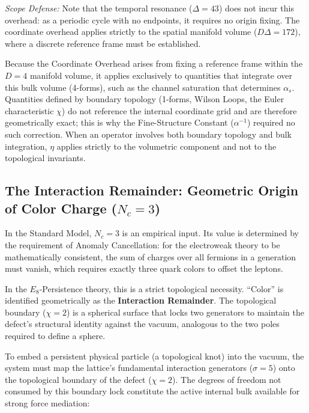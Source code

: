 \textit{Scope Defense:} Note that the temporal resonance ($\Delta = 43$) does not incur this overhead: as a periodic cycle with no endpoints, it requires no origin fixing. The coordinate overhead applies strictly to the spatial manifold volume ($D\Delta = 172$), where a discrete reference frame must be established.

Because the Coordinate Overhead arises from fixing a reference frame within the $D=4$ manifold volume, it applies exclusively to quantities that integrate over this bulk volume (4-forms), such as the channel saturation that determines $\alpha_s$. Quantities defined by boundary topology (1-forms, Wilson Loops, the Euler characteristic $\chi$) do not reference the internal coordinate grid and are therefore geometrically exact; this is why the Fine-Structure Constant ($\alpha^{-1}$) required no such correction. When an operator involves both boundary topology and bulk integration, $\eta$ applies strictly to the volumetric component and not to the topological invariants.


\subsection{The Interaction Remainder: Geometric Origin of Color Charge (\texorpdfstring{$N_c = 3$}{Nc = 3})}

In the Standard Model, $N_c = 3$ is an empirical input. Its value is determined by the requirement of Anomaly Cancellation: for the electroweak theory to be mathematically consistent, the sum of charges over all fermions in a generation must vanish, which requires exactly three quark colors to offset the leptons.

In the $E_8$-Persistence theory, this is a strict topological necessity. ``Color'' is identified geometrically as the \textbf{Interaction Remainder}. The topological boundary ($\chi = 2$) is a spherical surface that locks two generators to maintain the defect's structural identity against the vacuum, analogous to the two poles required to define a sphere.

To embed a persistent physical particle (a topological knot) into the vacuum, the system must map the lattice's fundamental interaction generators ($\sigma = 5$) onto the topological boundary of the defect ($\chi = 2$). The degrees of freedom not consumed by this boundary lock constitute the active internal bulk available for strong force mediation:

